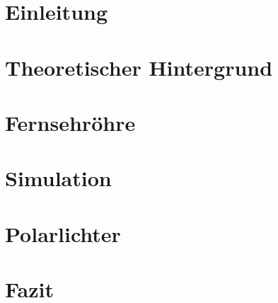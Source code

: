 \documentclass{include/thesisclass}
\begin{document}
    \FrontMatter

    
    

    \begingroup \let\clearpage\relax    %
    \tableofcontents                    %
    \listoffigures
    \listoftables
    \endgroup
    \cleardoublepage



    \MainMatter

    \chapter{Einleitung}
    
    \chapter{Theoretischer Hintergrund}
    
    \chapter{Fernsehröhre}
     
    \chapter{Simulation}
    \label{chap:sim}
    
    

    \chapter{Polarlichter}



    \chapter{Fazit}
    

    \Appendix
    \chapter*{\appendixname} 



    \TheBibliography

    
    

\end{document}
